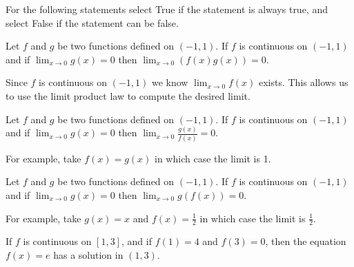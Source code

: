 \documentclass{ximera}
\author{Nela Lakos \and Kyle Parsons}
\begin{document}
\begin{exercise}

For the following statements select True if the statement is always true, and select False if the statement can be false.

Let $f$ and $g$ be two functions defined on $\left(-1,1\right)$. If $f$ is continuous on $\left(-1,1\right)$ and if $\lim_{x\to0}g(x)=0$ then $\lim_{x\to0}\left(f(x)g(x)\right) = 0$.

\begin{multipleChoice}
\end{multipleChoice}

\begin{feedback}
Since $f$ is continuous on $\left(-1,1\right)$ we know $\lim_{x\to0}f(x)$ exists.  This allows us to use the limit product law to compute the desired limit.
\end{feedback}

\begin{exercise}

Let $f$ and $g$ be two functions defined on $\left(-1,1\right)$. If $f$ is continuous on $\left(-1,1\right)$ and if $\lim_{x\to0}g(x)=0$ then $\lim_{x\to0}\frac{g(x)}{f(x)} = 0$.

\begin{multipleChoice}
\end{multipleChoice}

\begin{feedback}
For example, take $f(x)=g(x)$ in which case the limit is 1.
\end{feedback}

\begin{exercise}

Let $f$ and $g$ be two functions defined on $\left(-1,1\right)$. If $f$ is continuous on $\left(-1,1\right)$ and if $\lim_{x\to0}g(x)=0$ then $\lim_{x\to0}g(f(x)) = 0$.

\begin{multipleChoice}
\end{multipleChoice}

\begin{feedback}
For example, take $g(x) = x$ and $f(x) = \frac{1}{2}$ in which case the limit is $\frac{1}{2}$.
\end{feedback}

\begin{exercise}

If $f$ is continuous on $\left[1,3\right]$, and if $f(1) = 4$ and $f(3) = 0$, then the equation $f(x) = e$ has a solution in $\left(1,3\right)$.


\end{exercise}
\end{exercise}
\end{exercise}
\end{exercise}
\end{document}
